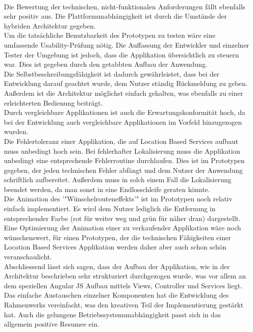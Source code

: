 \\
Die Bewertung der technischen, nicht-funktionalen Anforderungen fällt ebenfalls sehr positiv aus. Die Plattformunabhängigkeit ist durch die Umstände der hybriden Architektur gegeben.
\\
Um die tatsächliche Benutzbarkeit des Prototypen zu testen wäre eine umfassende Usability-Prüfung nötig. Die Auffassung der Entwickler und einzelner Tester der Umgebung ist jedoch, dass die Applikation übersichtlich zu steuern war. Dies ist gegeben durch den getabbten Aufbau der Anwendung. 
\\
Die Selbstbeschreibungsfähigkeit ist dadurch gewährleistet, dass bei der Entwicklung darauf geachtet wurde, dem Nutzer ständig Rückmeldung zu geben. Außerdem ist die Architektur möglichst einfach gehalten, was ebenfalls zu einer erleichterten Bedienung beiträgt.
\\
Durch vergleichbare Applikationen ist auch die Erwartungskonformität hoch, da bei der Entwicklung auch vergleichbare Applikationen im Vorfeld hinzugezogen wurden.
\\
Die Fehlertoleranz einer Applikation, die auf Location Based Services aufbaut muss unbedingt hoch sein. Bei fehlerhafter Lokalisierung muss die Applikation unbedingt eine entsprechende Fehlerroutine durchlaufen. Dies ist im Prototypen gegeben, der jeden technischen Fehler abfängt und dem Nutzer der Anwendung schriftlich aufbereitet. Außerdem muss in solch einem Fall die Lokalisierung beendet werden, da man sonst in eine Endlosschleife geraten könnte.
\\
Die Animation des '"Wünschelrouteneffekts'" ist im Prototypen noch relativ einfach implementiert. Es wird dem Nutzer lediglich die Entfernung in entsprechender Farbe (rot für weiter weg und grün für näher dran) dargestellt. Eine Optimierung der Animation einer zu verkaufender Applikation wäre noch wünschenswert, für einen Prototypen, der die technischen Fähigkeiten einer Location Based Services Applikation werden daher aber auch schon schön veranschaulicht.
\\
Abschliessend lässt sich sagen, dass der Aufbau der Applikation, wie in der Architektur beschrieben sehr strukturiert durchgezogen wurde, was vor allem an dem speziellen Angular JS Aufbau mittels Views, Controller und Services liegt. Das einfache Austauschen einzelner Komponenten hat die Entwicklung des Rahmenwerks vereinfacht, was den kreativen Teil der Implementierung gestärkt hat. Auch die gelungene Betriebssystemunabhängigkeit passt sich in das allgemein positive Resumee ein.
